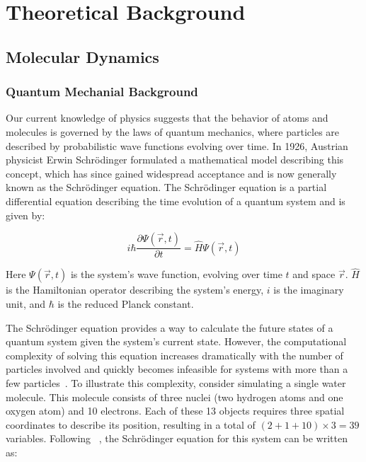 \chapter{Theoretical Background}
\label{sec:theoretical_background}


\section{Molecular Dynamics}

\subsection{Quantum Mechanial Background}

Our current knowledge of physics suggests that the behavior of atoms and molecules is governed by the laws of quantum mechanics, where particles are described by probabilistic wave functions evolving over time. In 1926, Austrian physicist Erwin Schrödinger formulated a mathematical model describing this concept, which has since gained widespread acceptance and is now generally known as the Schrödinger equation. The Schrödinger equation is a partial differential equation describing the time evolution of a quantum system and is given by:

\begin{equation}
      i \hbar \frac{\partial \Psi(\vec{r}, t)}{\partial t} = \hat{H} \Psi(\vec{r}, t)
\end{equation}

Here $\Psi(\vec{r}, t)$ is the system's wave function, evolving over time $t$ and space $\vec{r}$. $\hat{H}$ is the Hamiltonian operator describing the system's energy, $i$ is the imaginary unit, and $\hbar$ is the reduced Planck constant.
\smallskip

The Schrödinger equation provides a way to calculate the future states of a quantum system given the system's current state. However, the computational complexity of solving this equation increases dramatically with the number of particles involved and quickly becomes infeasible for systems with more than a few particles~\cite{Leimkuhler2015}. To illustrate this complexity, consider simulating a single water molecule. This molecule consists of three nuclei (two hydrogen atoms and one oxygen atom) and 10 electrons. Each of these 13 objects requires three spatial coordinates to describe its position, resulting in a total of $(2+1+10) \times 3 = 39$ variables. Following ~\cite{Leimkuhler2015}, the Schrödinger equation for this system can be written as:

